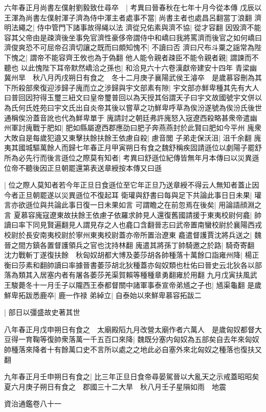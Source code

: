 六年春正月尚書左僕射劉毅致仕尋卒　|{
	考異曰晉春秋在七年十月今從本傳}
戊辰以王渾為尚書左僕射渾子濟為侍中渾主者處事不當|{
	尚書主者也處昌呂翻當丁浪翻}
濟明法繩之|{
	侍中管門下諸事故得䋲以法}
濟從兄佑素與濟不協|{
	從才容翻}
因毁濟不能容其父帝由是疎濟後坐事免官濟性豪侈帝謂侍中和嶠曰我將罵濟而後官之如何嶠曰濟俊爽恐不可屈帝召濟切讓之既而曰頗知愧不|{
	不讀曰否}
濟曰尺布斗粟之謡常為陛下愧之|{
	謂帝不能容齊王攸也為于偽翻}
他人能令親者疎臣不能令親者親|{
	謂諫而不聽也}
以此愧陛下耳帝默然嶠洽之孫也|{
	和洽見六十六卷漢獻帝建安十四年}
青梁幽冀州旱　秋八月丙戌朔日有食之　冬十二月庚子襄陽武侯王濬卒　是歲慕容刪為其下所殺部衆復迎涉歸子廆而立之涉歸與宇文部素有隙|{
	宇文部亦鮮卑種其先有大人曰普回因狩得玉璽三紐文曰皇帝璽普回以為天授其俗謂天子曰宇文故國號宇文併以為氏何氏姓苑曰宇文氏出自炎帝其後以嘗草之功鮮卑呼草為俟汾遂號為俟汾氏後世通稱俟汾蓋音訛也代為鮮卑單于}
廆請討之朝廷弗許廆怒入宼遼西殺略甚衆帝遣幽州軍討廆戰于肥如|{
	肥如縣屬遼西郡應劭曰肥子奔燕燕封於此賢曰肥如今平州}
廆衆大敗自是每歲犯邉又東擊扶餘扶餘王依慮自殺|{
	慮音閭}
子弟走保沃沮|{
	沮千余翻}
廆夷其國城驅萬餘人而歸七年春正月甲寅朔日有食之魏舒稱疾固請遜位以劇陽子罷舒所為必先行而後言遜位之際莫有知者|{
	考異曰舒遜位紀傳皆無年月本傳曰以災異遜位帝不聽後因正旦朝罷還第表送章綬按本傳又曰遜}


|{
	位之際人莫知者若今年正旦日食遜位至它年正旦乃送章綬不得云人無知者蓋止因今者正旦朝罷遂以災異遜位不復起耳}
衛瓘與舒書曰每與足下共論此事日日未果|{
	瓘言亦欲遜位與共論此事日復一日未果如言}
可謂瞻之在前忽焉在後矣|{
	用論語顔淵之言}
夏慕容廆寇遼東故扶餘王依慮子依羅求帥見人還復舊國請援于東夷校尉何龕|{
	帥讀曰率下同見賢遍翻見人謂見存之人也龕口含翻晉志曰武帝置南蠻校尉於襄陽西戎校尉於長安南夷校尉於寧州東夷校尉蓋亦帝所置治遼東}
龕遣督護賈沈將兵送之|{
	魏晉之間方鎮各置督護領兵之官也沈持林翻}
廆遣其將孫丁帥騎邀之於路|{
	騎奇寄翻}
沈力戰斬丁遂復扶餘　秋匈奴胡都大博及萎莎胡各帥種落十萬餘口詣雍州降|{
	楊正衡曰莎素和翻帥讀曰率據晉書萎莎胡北狄種蓋亦匈奴類也杜佑曰晉史云北狄各以部落為類其入居塞内者有屠各萎莎羌渠賀賴等種種章勇翻雍於用翻}
九月戊寅扶風武王駿薨冬十一月壬子以隴西王泰都督關中諸軍事泰宣帝弟馗之子也|{
	馗渠龜翻}
是歲鮮卑拓跋悉鹿卒|{
	鹿一作禄}
弟綽立|{
	自泰始以來鮮卑慕容拓跋二}


|{
	部日以彊盛故史著其世}


八年春正月戊申朔日有食之　太廟殿䧟九月改營太廟作者六萬人　是歲匈奴都督大豆得一育鞠等復帥衆落萬一千五百口來降|{
	魏既分塞内匈奴為五部矣自去年來匈奴帥種落來降者十有餘萬口史不言所以處之之地此必自塞外來北匈奴之種落也復扶又翻}


九年春正月壬申朔日有食之|{
	比三年正旦日食帝尋晏駕晉以大亂天之示戒蓋昭昭矣}
夏六月庚子朔日有食之　郡國三十二大旱　秋八月壬子星隕如雨　地震

資治通鑑卷八十一

